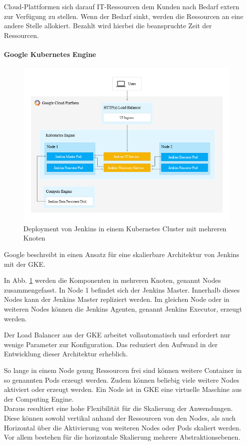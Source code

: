 Cloud-Plattformen sich darauf IT-Ressourcen dem Kunden nach Bedarf extern zur Verfügung zu stellen. Wenn der Bedarf sinkt, werden die Ressourcen an eine andere Stelle allokiert. Bezahlt wird hierbei die beanspruchte Zeit der Ressourcen. 

\paragraph{Google Kubernetes Engine}

\begin{figure}[htbp]
 \centering
 \includegraphics[width=1.0\textwidth]{gfx/jenkins-kubernetes-architecture.png}
 \caption{Deployment von Jenkins in einem Kubernetes Cluster mit mehreren Knoten \cite{Google:GKEJenkins}\label{fig:gkejenkins}}
\end{figure}

Google beschreibt in \cite{Google:GKEJenkins} einen Ansatz für eine skalierbare Architektur von Jenkins mit der \ac{GKE}.

In Abb. \ref{fig:gkejenkins} werden die Komponenten in mehreren Knoten, genannt Nodes zusammengefasst. In Node 1 befindet sich der Jenkins Master. Innerhalb dieses Nodes kann der Jenkins Master repliziert werden. Im gleichen Node oder in weiteren Nodes können die Jenkins Agenten, genannt Jenkins Executor, erzeugt werden.

Der Load Balancer aus der \ac{GKE} arbeitet vollautomatisch und erfordert nur wenige Parameter zur Konfiguration. Das reduziert den Aufwand in der Entwicklung dieser Architektur erheblich.

So lange in einem Node genug Ressourcen frei sind können weitere Container in so genannten Pods erzeugt werden. Zudem können beliebig viele weitere Nodes aktiviert oder erzeugt werden. Ein Node ist in \ac{GKE} eine virtuelle Maschine aus der Computing Engine.
\medskip
\\
Daraus resultiert eine hohe Flexibilität für die Skalierung der Anwendungen. Diese können sowohl vertikal anhand der Ressourcen von den Nodes, als auch Horizontal über die Aktivierung von weiteren Nodes oder Pods skaliert werden. Vor allem bestehen für die horizontale Skalierung mehrere Abstraktionsebenen.

